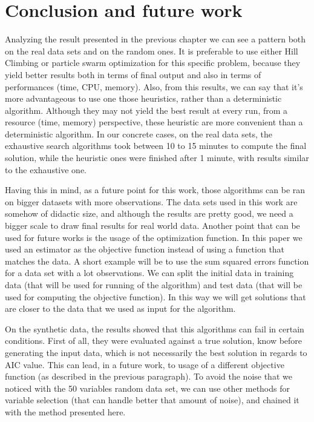 \chapter{Conclusion and future work}
Analyzing the result presented in the previous chapter we can see a pattern both on the real data sets and on the random ones. It is preferable to use either Hill Climbing or particle swarm optimization for this specific problem, because they yield better results both in terms of final output and also in terms of performances (time, CPU, memory). Also, from this results, we can say that it's more advantageous to use one those heuristics, rather than a deterministic algorithm. Although they may not yield the best result at every run, from a resource (time, memory) perspective, these heuristic are more convenient than a deterministic algorithm. In our concrete cases, on the real data sets, the exhaustive search algorithms took between 10 to 15 minutes to compute the final solution, while the heuristic ones were finished after 1 minute, with results similar to the exhaustive one.

Having this in mind, as a future point for this work, those algorithms can be ran on bigger datasets with more observations. The data sets used in this work are somehow of didactic size, and although the results are pretty good, we need a bigger scale to draw final results for real world data. Another point that can be used for future works is the usage of the optimization function. In this paper we used an estimator as the objective function instead of using a function that matches the data. A short example will be to use the sum squared errors function for a data set with a lot observations. We can split the initial data in training data (that will be used for running of the algorithm) and test data (that will be used for computing the objective function). In this way we will get solutions that are closer to the data that we used as input for the algorithm.

On the synthetic data, the results showed that this algorithms can fail in certain conditions. First of all, they were evaluated against a true solution, know before generating the input data, which is not necessarily the best solution in regards to AIC value. This can lead, in a future work, to usage of a different objective function (as described in the previous paragraph). To avoid the noise that we noticed with the 50 variables random data set, we can use other methods for variable selection (that can handle better that amount of noise), and chained it with the method presented here.

